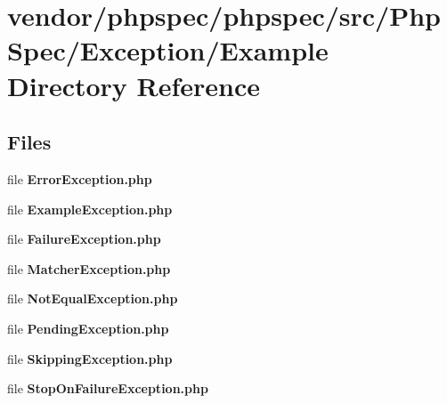 \section{vendor/phpspec/phpspec/src/\+Php\+Spec/\+Exception/\+Example Directory Reference}
\label{dir_77540f61960f0cfbe7598e28919f625d}
\subsection*{Files}
\begin{DoxyCompactItemize}
\item 
file {\bf Error\+Exception.\+php}
\item 
file {\bf Example\+Exception.\+php}
\item 
file {\bf Failure\+Exception.\+php}
\item 
file {\bf Matcher\+Exception.\+php}
\item 
file {\bf Not\+Equal\+Exception.\+php}
\item 
file {\bf Pending\+Exception.\+php}
\item 
file {\bf Skipping\+Exception.\+php}
\item 
file {\bf Stop\+On\+Failure\+Exception.\+php}
\end{DoxyCompactItemize}
